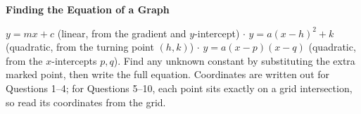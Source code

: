 \documentclass[11pt]{article}
\begin{document}
\begin{center}
  {\Large\bfseries Finding the Equation of a Graph}
\end{center}

\vspace{0.2em}
\noindent $y = mx+c$ (linear, from the gradient and $y$-intercept) \quad\(\cdot\)\quad
$y=a(x-h)^2+k$ (quadratic, from the turning point $(h,k)$) \quad\(\cdot\)\quad
$y=a(x-p)(x-q)$ (quadratic, from the $x$-intercepts $p,q$).
Find any unknown constant by substituting the extra marked point, then write the full equation.
Coordinates are written out for Questions 1--4; for Questions 5--10, each point sits exactly on a grid intersection, so read its coordinates from the grid.

\vspace{0.3em}
\end{document}
